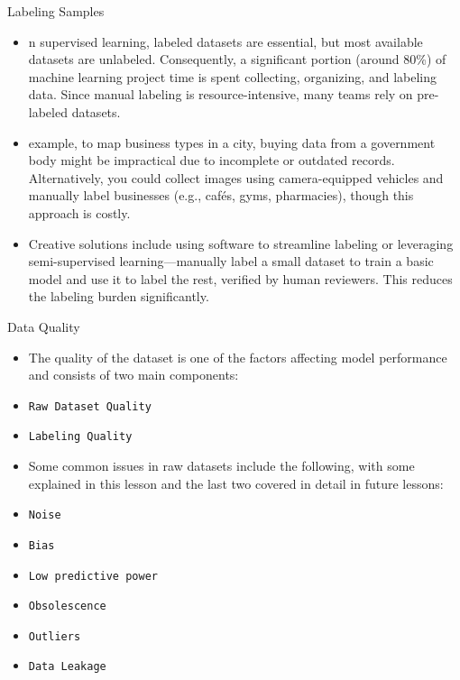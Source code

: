 \documentclass[serif, aspectratio=169]{beamer}
\begin{document}
\begin{frame}{Labeling Samples}
    \begin{itemize}
        \item n supervised learning, labeled datasets are essential, but most available datasets are unlabeled. Consequently, a significant portion (around 80\%) of machine learning project time is spent collecting, organizing, and labeling data. Since manual labeling is resource-intensive, many teams rely on pre-labeled datasets.

        \item  example, to map business types in a city, buying data from a government body might be impractical due to incomplete or outdated records. Alternatively, you could collect images using camera-equipped vehicles and manually label businesses (e.g., cafés, gyms, pharmacies), though this approach is costly.

        \item Creative solutions include using software to streamline labeling or leveraging semi-supervised learning—manually label a small dataset to train a basic model and use it to label the rest, verified by human reviewers. This reduces the labeling burden significantly.

    \end{itemize}
\end{frame}


\begin{frame}{Data Quality}
    \begin{itemize}
        \item The quality of the dataset is one of the factors affecting model performance and consists of two main components:
        \item \texttt{\color{red}Raw Dataset Quality}
        \item \texttt{\color{red}Labeling Quality}
    \end{itemize}
\end{frame}

\begin{frame}
    \begin{itemize}
        \item Some common issues in raw datasets include the following, with some explained in this lesson and the last two covered in detail in future lessons:
        \item \texttt{\color{red}Noise}
        \item \texttt{\color{red}Bias}
        \item \texttt{\color{red}Low predictive power}
        \item \texttt{\color{red}Obsolescence}
         \item \texttt{\color{red}Outliers}
        \item \texttt{\color{red}Data Leakage}
    \end{itemize}
\end{frame}
\end{document}
